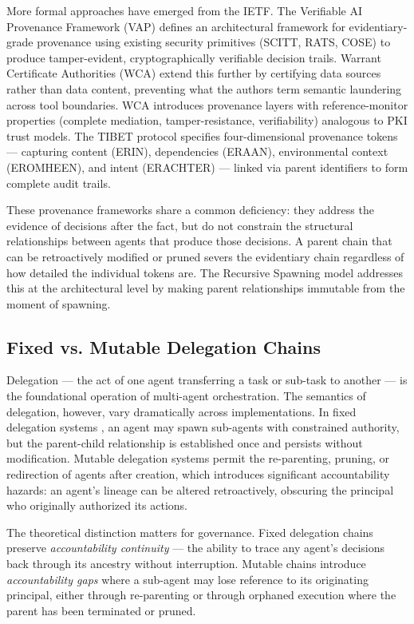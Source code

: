 More formal approaches have emerged from the IETF. The Verifiable AI Provenance Framework (VAP) \cite{vap} defines an architectural framework for evidentiary-grade provenance using existing security primitives (SCITT, RATS, COSE) to produce tamper-evident, cryptographically verifiable decision trails. Warrant Certificate Authorities (WCA) \cite{wca} extend this further by certifying data sources rather than data content, preventing what the authors term semantic laundering across tool boundaries. WCA introduces provenance layers with reference-monitor properties (complete mediation, tamper-resistance, verifiability) analogous to PKI trust models. The TIBET protocol \cite{tibet} specifies four-dimensional provenance tokens — capturing content (ERIN), dependencies (ERAAN), environmental context (EROMHEEN), and intent (ERACHTER) — linked via parent identifiers to form complete audit trails.

These provenance frameworks share a common deficiency: they address the evidence of decisions after the fact, but do not constrain the structural relationships between agents that produce those decisions. A parent chain that can be retroactively modified or pruned severs the evidentiary chain regardless of how detailed the individual tokens are. The Recursive Spawning model addresses this at the architectural level by making parent relationships immutable from the moment of spawning.

\subsection{Fixed vs. Mutable Delegation Chains}

Delegation — the act of one agent transferring a task or sub-task to another — is the foundational operation of multi-agent orchestration. The semantics of delegation, however, vary dramatically across implementations. In fixed delegation systems \cite{fixeddelegation}, an agent may spawn sub-agents with constrained authority, but the parent-child relationship is established once and persists without modification. Mutable delegation systems \cite{mutabledelegation} permit the re-parenting, pruning, or redirection of agents after creation, which introduces significant accountability hazards: an agent's lineage can be altered retroactively, obscuring the principal who originally authorized its actions.

The theoretical distinction matters for governance. Fixed delegation chains preserve \textit{accountability continuity} — the ability to trace any agent's decisions back through its ancestry without interruption. Mutable chains introduce \textit{accountability gaps} where a sub-agent may lose reference to its originating principal, either through re-parenting or through orphaned execution where the parent has been terminated or pruned.

